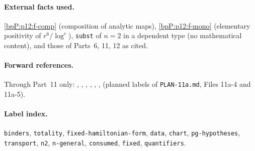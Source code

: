 \paragraph{External facts used.} \ref{bpP:p12:f-comp} (composition of analytic maps), \ref{bpP:p12:f-mono} (elementary positivity of $r^6/\log^c$), \texttt{subst} of $n=2$ in a dependent type (no mathematical content), and those of Parts~6, 11, 12 as cited.

\paragraph{Forward references.} Through Part~11 only: , , , , , ,  (planned labels of \texttt{PLAN-11a.md}, Files 11a-4 and 11a-5).

\paragraph{Label index.} \texttt{binders}, \texttt{totality}, \texttt{fixed-hamiltonian-form}, \texttt{data}, \texttt{chart}, \texttt{pg-hypotheses}, \texttt{transport}, \texttt{n2}, \texttt{n-general}, \texttt{consumed}, \texttt{fixed}, \texttt{quantifiers}.
\par\endgroup
